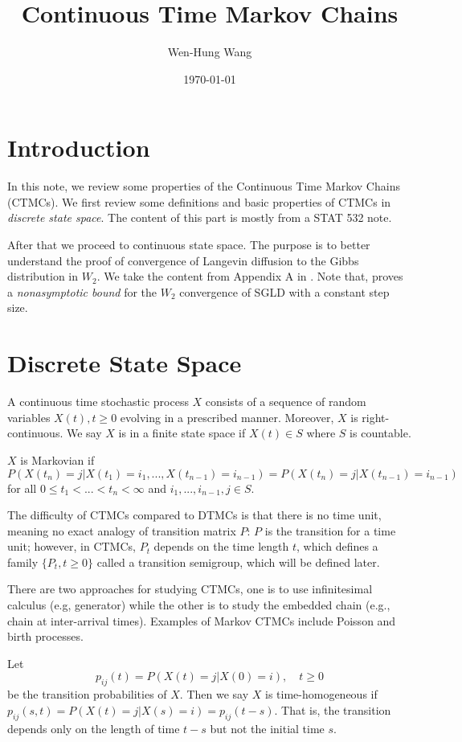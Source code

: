 \documentclass[11pt,twoside]{article}
\title{Continuous Time Markov Chains}
\author{Wen-Hung Wang}
\date{\today}
\begin{document}
\maketitle

\section{Introduction}
In this note, we review some properties of the Continuous Time Markov Chains (CTMCs). We first review some definitions and basic properties of CTMCs in \emph{discrete state space}. The content of this part is mostly from a STAT 532 note. 

After that we proceed to continuous state space. The purpose is to better understand the proof of convergence of Langevin diffusion to the Gibbs distribution in $W_2$. We take the content from Appendix A in \cite{raginsky2017non}. Note that, \cite{raginsky2017non} proves a \emph{nonasymptotic bound} for the $W_2$ convergence of SGLD with a constant step size.

\section{Discrete State Space}
A continuous time stochastic process $X$ consists of a sequence of random variables $X(t), t \geq 0$ evolving in a prescribed manner. Moreover, $X$ is right-continuous. We say $X$ is in a finite state space if $X(t) \in S$ where $S$ is countable. 

\begin{definition}[Markov]
    $X$ is Markovian if 
    \[
    P(X(t_n) = j | X(t_1)=i_1,...,X(t_{n-1})=i_{n-1}) = P(X(t_n) = j | X(t_{n-1})=i_{n-1})
    \]
    for all $0 \leq t_1 <...<t_n < \infty$ and $i_1,...,i_{n-1},j \in S$.
\end{definition}

The difficulty of CTMCs compared to DTMCs is that there is no time unit, meaning no exact analogy of transition matrix $P$: $P$ is the transition for a time unit; however, in CTMCs, $P_t$ depends on the time length $t$, which defines a family $\{P_t, t\geq 0\}$ called a transition semigroup, which will be defined later.

There are two approaches for studying CTMCs, one is to use infinitesimal calculus (e.g, generator) while the other is to study the embedded chain (e.g., chain at inter-arrival times). Examples of Markov CTMCs include Poisson and birth processes. 

\begin{definition} Let 
\[
p_{ij}(t) = P(X(t) = j | X(0) = i), \quad t \geq 0
\]
be the transition probabilities of $X$. Then we say $X$ is time-homogeneous if $p_{ij}(s, t) = P(X(t) = j | X(s) = i) = p_{ij}(t-s)$. That is, the transition depends only on the length of time $t-s$ but not the initial time $s$.
\end{definition}
\end{document}
